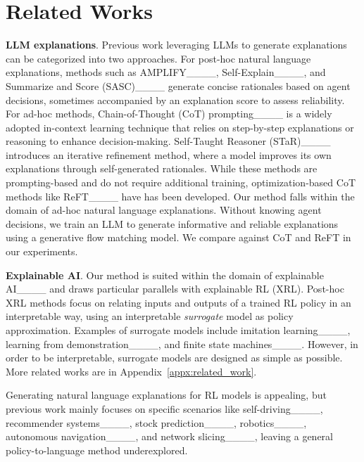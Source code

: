 \section{Related Works}
\textbf{LLM explanations}. 
Previous work leveraging LLMs to generate explanations can be categorized into two approaches. For post-hoc natural language explanations, methods such as AMPLIFY____, Self-Explain____, and Summarize and Score (SASC)____ generate concise rationales based on agent decisions, sometimes accompanied by an explanation score to assess reliability. For ad-hoc methods, Chain-of-Thought (CoT) prompting____ is a widely adopted in-context learning technique that relies on step-by-step explanations or reasoning to enhance decision-making. Self-Taught Reasoner (STaR)____ introduces an iterative refinement method, where a model improves its own explanations through self-generated rationales. While these methods are prompting-based and do not require additional training, optimization-based CoT methods like ReFT____ have has been developed. Our method falls within the domain of ad-hoc natural language explanations. Without knowing agent decisions, we train an LLM to generate informative and reliable explanations using a generative flow matching model. We compare against CoT and ReFT in our experiments. 

\textbf{Explainable AI}. Our method is suited within  the domain of explainable AI____ and draws particular parallels with explainable RL (XRL). Post-hoc XRL methods focus on relating inputs and outputs of a trained RL policy in an interpretable way, using an interpretable \emph{surrogate} model as policy approximation. Examples of surrogate models include imitation learning____, learning from demonstration____, and finite state machines____. However, in order to be interpretable, surrogate models are designed as simple as possible. More related works are in Appendix~\ref{appx:related_work}.

Generating natural language explanations for RL models is appealing, but previous work mainly focuses on specific scenarios like self-driving____, recommender systems____, stock prediction____, robotics____, autonomous navigation____, and network slicing____, leaving a general policy-to-language method underexplored. 

